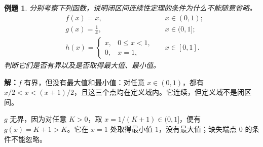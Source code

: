 \documentclass[UTF8,fontset=fandol,11pt]{ctexart}
\newtheorem{example}[definition]{例题}
\begin{document}
\begin{example}
分别考察下列函数，说明闭区间连续性定理的条件为什么不能随意省略。
\[
\begin{aligned}
&f(x)=x,&&x\in(0,1);\\
&g(x)=\frac{1}{x},&&x\in(0,1];\\
&h(x)=\begin{cases}x,&0\leq x<1,\\0,&x=1,\end{cases}&&x\in[0,1].
\end{aligned}
\]
判断它们是否有界以及是否取得最大值、最小值。
\end{example}
\par\noindent\textbf{解：}$f$ 有界，但没有最大值和最小值：对任意 $x\in(0,1)$，都有 $x/2<x<(x+1)/2$，且这三个点均在定义域内。它连续，但定义域不是闭区间。

$g$ 无界，因为对任意 $K>0$，取 $x=1/(K+1)\in(0,1]$，便有 $g(x)=K+1>K$。它在 $x=1$ 处取得最小值 $1$，没有最大值；缺失端点 $0$ 的条件不能忽略。
\end{document}
